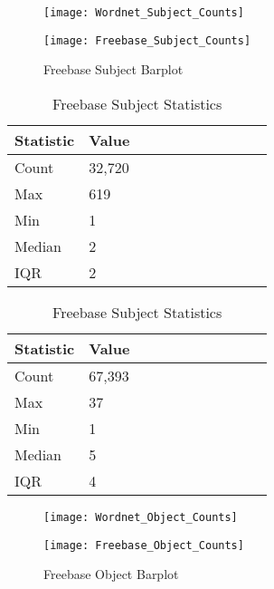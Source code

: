 
\begin{figure}[H]
	\parbox{.5\linewidth}{
   		\caption{Wordnet Subject Barplot}
   		\centering
    		\texttt{[image: Wordnet\_Subject\_Counts]}
		}
	\hfill
	\parbox{.5\linewidth}{
		\caption{Freebase Subject Barplot}
   		\centering
		\texttt{[image: Freebase\_Subject\_Counts]}
		}
\end{figure}


\begin{table}[H]
	\parbox{.5\linewidth}{
		\caption{Wordnet Subject Statistics}
		\centering
		\begin{tabular}{lllllllllll}
  			\textbf{Statistic} & \textbf{Value}  \\
  			\hline
			Count & 32,720 \\
			Max & 619 \\
			Min & 1 \\
  			Median & 2 \\
  			IQR & 2 \\
		\end{tabular}
		}
	\hfill
	\parbox{.5\linewidth}{
		\caption{Freebase Subject Statistics}
		\centering
		\begin{tabular}{lllllllllll}
  			\textbf{Statistic} & \textbf{Value}  \\
  			\hline
			Count & 67,393 \\
			Max & 37 \\
			Min & 1 \\
  			Median & 5 \\
  			IQR & 4 \\
		\end{tabular}
		}
\end{table}


\begin{figure}[H]
	\parbox{.5\linewidth}{
   		\caption{Wordnet Object Barplot}
   		\centering
    		\texttt{[image: Wordnet\_Object\_Counts]}
		}
	\hfill
	\parbox{.5\linewidth}{
		\caption{Freebase Object Barplot}
   		\centering
		\texttt{[image: Freebase\_Object\_Counts]}
		}
\end{figure}


